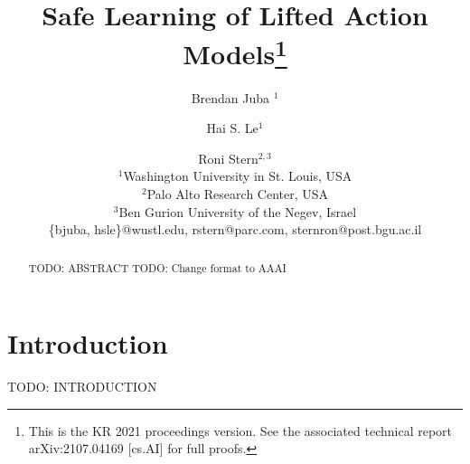 \documentclass{article}
\title{Safe Learning of Lifted Action Models\thanks{This is the KR 2021 proceedings version. See the associated technical report arXiv:2107.04169 [cs.AI] for full proofs.}}
\author{%
Brendan Juba $^1$\and
Hai S. Le$^1$\and
Roni Stern$^{2,3}$\\
\affiliations
$^1$Washington University in St. Louis, USA\\
$^2$Palo Alto Research Center, USA\\
$^3$Ben Gurion University of the Negev, Israel\\

\emails
\{bjuba, hsle\}@wustl.edu,
rstern@parc.com,
sternron@post.bgu.ac.il
}
\begin{document}
\maketitle

\begin{abstract}

TODO: ABSTRACT
TODO: Change format to AAAI
\end{abstract}

\section{Introduction}
TODO: INTRODUCTION

\end{document}
